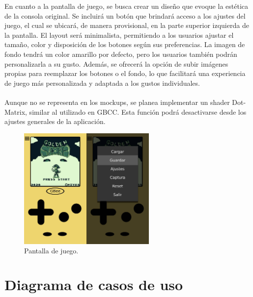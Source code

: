 En cuanto a la pantalla de juego, se busca crear un diseño que evoque la estética de la consola original. Se incluirá un botón que brindará acceso a los ajustes del juego, el cual se ubicará, de manera provisional, en la parte superior izquierda de la pantalla. El layout será minimalista, permitiendo a los usuarios ajustar el tamaño, color y disposición de los botones según sus preferencias. La imagen de fondo tendrá un color amarillo por defecto, pero los usuarios también podrán personalizarla a su gusto. Además, se ofrecerá la opción de subir imágenes propias para reemplazar los botones o el fondo, lo que facilitará una experiencia de juego más personalizada y adaptada a los gustos individuales.
\\\\
Aunque no se representa en los mockups, se planea implementar un shader Dot-Matrix, similar al utilizado en GBCC. Esta función podrá desactivarse desde los ajustes generales de la aplicación.

\begin{figure}[h]
    \centering
    \includegraphics[width=0.6\textwidth]{include/images/mockgame.jpg}
    \caption{Pantalla de juego.}
    \label{figure:mockupgame}
\end{figure}

\clearpage

\section{Diagrama de casos de uso}

\cleardoublepage